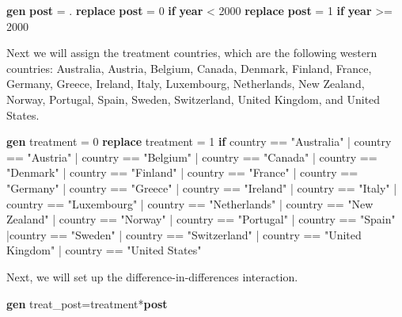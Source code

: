 \documentclass[
]{book}
\newenvironment{Shaded}{\begin{snugshade}}{\end{snugshade}}
\newcommand{\FunctionTok}[1]{\textcolor[rgb]{0.13,0.29,0.53}{\textbf{#1}}}
\newcommand{\KeywordTok}[1]{\textcolor[rgb]{0.13,0.29,0.53}{\textbf{#1}}}
\newcommand{\NormalTok}[1]{#1}
\newcommand{\StringTok}[1]{\textcolor[rgb]{0.31,0.60,0.02}{#1}}
\begin{document}
\begin{Shaded}
\begin{Highlighting}[]
\KeywordTok{gen} \KeywordTok{post}\NormalTok{ = .}
\KeywordTok{replace} \KeywordTok{post}\NormalTok{ = 0 }\KeywordTok{if} \FunctionTok{year}\NormalTok{ \textless{} 2000}
\KeywordTok{replace} \KeywordTok{post}\NormalTok{ = 1 }\KeywordTok{if} \FunctionTok{year}\NormalTok{ \textgreater{}= 2000}
\end{Highlighting}
\end{Shaded}

Next we will assign the treatment countries, which are the following western countries: Australia, Austria, Belgium, Canada, Denmark, Finland, France, Germany, Greece, Ireland, Italy, Luxembourg, Netherlands, New Zealand, Norway, Portugal, Spain, Sweden, Switzerland, United Kingdom, and United States.

\begin{Shaded}
\begin{Highlighting}[]
\KeywordTok{gen}\NormalTok{ treatment = 0}
\KeywordTok{replace}\NormalTok{ treatment = 1 }\KeywordTok{if}\NormalTok{ country == }\StringTok{"Australia"}\NormalTok{ | country == }\StringTok{"Austria"}\NormalTok{ | country == }\StringTok{"Belgium"}\NormalTok{ | country == }\StringTok{"Canada"}\NormalTok{ | country == }\StringTok{"Denmark"}\NormalTok{ | country == }\StringTok{"Finland"}\NormalTok{ | country == }\StringTok{"France"}\NormalTok{ | country == }\StringTok{"Germany"}\NormalTok{ | country == }\StringTok{"Greece"}\NormalTok{ | country == }\StringTok{"Ireland"}\NormalTok{ | country == }\StringTok{"Italy"}\NormalTok{ | country == }\StringTok{"Luxembourg"}\NormalTok{ | country == }\StringTok{"Netherlands"}\NormalTok{ | country == }\StringTok{"New Zealand"}\NormalTok{ | country == }\StringTok{"Norway"}\NormalTok{ | country == }\StringTok{"Portugal"}\NormalTok{ | country == }\StringTok{"Spain"}\NormalTok{ |country == }\StringTok{"Sweden"}\NormalTok{ | country == }\StringTok{"Switzerland"}\NormalTok{ | country == }\StringTok{"United Kingdom"}\NormalTok{ | country == }\StringTok{"United States"}
\end{Highlighting}
\end{Shaded}

Next, we will set up the difference-in-differences interaction.

\begin{Shaded}
\begin{Highlighting}[]
\KeywordTok{gen}\NormalTok{ treat\_post=treatment*}\KeywordTok{post}
\end{Highlighting}
\end{Shaded}
\end{document}

